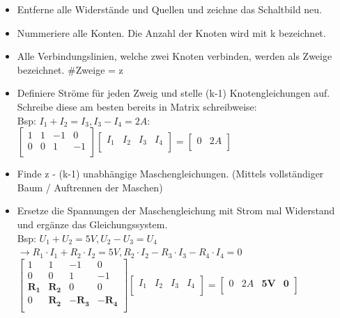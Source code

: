 					            \begin{center}
					              \begin{itemize}
					                \item Entferne alle Widerstände und Quellen und zeichne das Schaltbild neu.
					                \item Nummeriere alle Konten. Die Anzahl der Knoten wird mit k bezeichnet.
					                \item Alle Verbindungslinien, welche zwei Knoten verbinden, werden als Zweige bezeichnet. \#Zweige = z
					                \item Definiere Ströme für jeden Zweig und stelle (k-1) Knotengleichungen auf. Schreibe diese am besten bereits in Matrix schreibweise: \\
					                Bsp: $I_1 + I_2 = I_3, I_3 - I_4 = 2A $: \\
					                $
					 \left[ {\begin{array}{cccc}
					    1 & 1 & -1 & 0 \\
					    0 & 0 & 1 & -1 \\					\end{array} } \right] \left[ {\begin{array}{c} I_1 & I_2 & I_3 & I_4 \\ \end{array} } \right] =   \left[ {\begin{array}{c}  0 & 2A\\ \end{array} } \right] $ \\

					                \item Finde z - (k-1) unabhängige Maschengleichungen. (Mittels vollständiger Baum / Auftrennen der Maschen)
					                \item Ersetze die Spannungen der Maschengleichung mit Strom mal Widerstand und ergänze das Gleichungssystem.
					                \\ Bsp:
					                $U_1 + U_2 = 5V, U_2 - U_3 = U_4$ \\ $ \rightarrow R_1 \cdot I_1 + R_2 \cdot I_2 = 5V, R_2 \cdot I_2 - R_3 \cdot I_3 - R_4 \cdot I_4 = 0$ \\
					                $
					 \left[ {\begin{array}{cccc}
					    1 & 1 & -1 & 0 \\
					    0 & 0 & 1 & -1 \\
					    \mathbf{R_1} & \mathbf{R_2} & 0 & 0 \\
					    0 & \mathbf{R_2} & \mathbf{-R_3} & \mathbf{-R_4} \\
					\end{array} } \right] \left[ {\begin{array}{c} I_1 & I_2 & I_3 & I_4 \\ \end{array} } \right] =   \left[ {\begin{array}{c}  0 & 2A & \mathbf{5V} & \mathbf{0} \\ \end{array} } \right] $ \\

					              \end{itemize}
					            \end{center}
					            \iend
